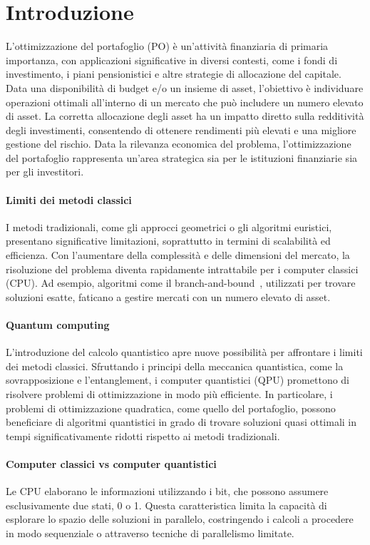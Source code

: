 \section{Introduzione}\label{sec:introduction}
L'ottimizzazione del portafoglio (PO) è un'attività finanziaria di primaria 
importanza, con applicazioni significative in diversi contesti, come 
i fondi di investimento, i piani pensionistici e altre strategie di 
allocazione del capitale. Data una disponibilità di budget e/o un 
insieme di asset, l'obiettivo è individuare operazioni ottimali 
all'interno di un mercato che può includere un numero elevato di asset.
La corretta allocazione degli asset ha un impatto diretto sulla 
redditività degli investimenti, consentendo di ottenere rendimenti più 
elevati e una migliore gestione del rischio. Data la rilevanza economica 
del problema, l'ottimizzazione del portafoglio rappresenta un'area 
strategica sia per le istituzioni finanziarie sia per gli investitori.

\paragraph{Limiti dei metodi classici}
I metodi tradizionali, come gli approcci geometrici o gli algoritmi 
euristici, presentano significative limitazioni, soprattutto in termini 
di scalabilità ed efficienza. Con l'aumentare della complessità e delle 
dimensioni del mercato, la risoluzione del problema diventa rapidamente 
intrattabile per i computer classici (CPU). Ad esempio, algoritmi come il 
branch-and-bound~\cite{land2010automatic}, utilizzati per trovare soluzioni 
esatte, faticano a gestire mercati con un numero elevato di asset. 

\paragraph{Quantum computing}
L'introduzione del calcolo quantistico apre nuove possibilità per 
affrontare i limiti dei metodi classici. Sfruttando i principi della 
meccanica quantistica, come la sovrapposizione e l'entanglement, i 
computer quantistici (QPU) promettono di risolvere problemi di ottimizzazione 
in modo più efficiente. In particolare, i problemi di ottimizzazione 
quadratica, come quello del portafoglio, possono beneficiare di 
algoritmi quantistici in grado di trovare soluzioni quasi ottimali in 
tempi significativamente ridotti rispetto ai metodi tradizionali.

\paragraph{Computer classici vs computer quantistici}
Le CPU elaborano le informazioni utilizzando i bit, che 
possono assumere esclusivamente due stati, 0 o 1. Questa caratteristica 
limita la capacità di esplorare lo spazio delle soluzioni in parallelo, 
costringendo i calcoli a procedere in modo sequenziale o attraverso 
tecniche di parallelismo limitate.

